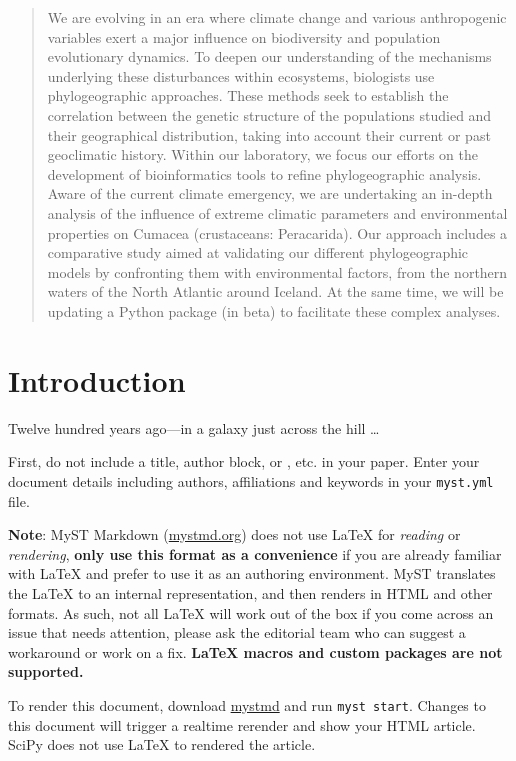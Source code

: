 \begin{abstract}
We are evolving in an era where climate change and various anthropogenic variables exert a major influence on biodiversity and population evolutionary dynamics. To deepen our understanding of the mechanisms underlying these disturbances within ecosystems, biologists use phylogeographic approaches. These methods seek to establish the correlation between the genetic structure of the populations studied and their geographical distribution, taking into account their current or past geoclimatic history. Within our laboratory, we focus our efforts on the development of bioinformatics tools to refine phylogeographic analysis. Aware of the current climate emergency, we are undertaking an in-depth analysis of the influence of extreme climatic parameters and environmental properties on Cumacea (crustaceans: Peracarida). Our approach includes a comparative study aimed at validating our different phylogeographic models by confronting them with environmental factors, from the northern waters of the North Atlantic around Iceland. At the same time, we will be updating a Python package (in beta) to facilitate these complex analyses.
\end{abstract}

\section{Introduction}\label{introduction}

Twelve hundred years ago—in a galaxy just across the hill \ldots

First, do not include a title, author block, or \verb||, etc.
in your paper. Enter your document details including authors, affiliations and keywords in your \texttt{myst.yml} file.

\textbf{Note}: MyST Markdown (\href{https://mystmd.org}{mystmd.org}) does not use
LaTeX for \emph{reading} or \emph{rendering}, \textbf{only use this format as a convenience} if you are
already familiar with LaTeX and prefer to use it as an authoring environment.
MyST translates the LaTeX to an internal representation, and then renders in HTML and other formats.
As such, not all LaTeX will work out of the box if you come across an issue that needs attention,
please ask the editorial team who can suggest a workaround or work on a fix.
\textbf{LaTeX macros and custom packages are not supported.}

To render this document, download \href{https://mystmd.org/guide/quickstart}{mystmd} and run \texttt{myst start}.
Changes to this document will trigger a realtime rerender and show your HTML article.
SciPy does not use LaTeX to rendered the article.

